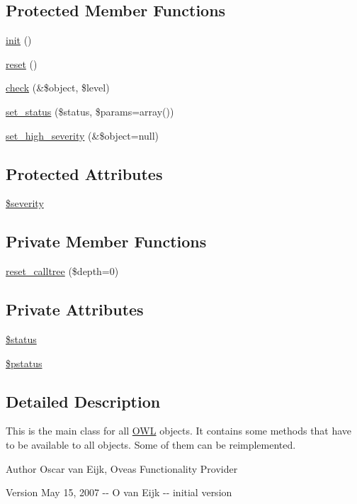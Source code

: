 \subsection*{Protected Member Functions}
\begin{DoxyCompactItemize}
\item 
\hyperlink{class__OWL_ae0ef3ded56e8a6b34b6461e5a721cd3e}{init} ()
\item 
\hyperlink{class__OWL_a2f2a042bcf31965194c03033df0edc9b}{reset} ()
\item 
\hyperlink{class__OWL_ad6f4f6946f40199dd0333cf219fa500e}{check} (\&\$object, \$level)
\item 
\hyperlink{class__OWL_aea912d0ede9b3c2a69b79072d94d4787}{set\_\-status} (\$status, \$params=array())
\item 
\hyperlink{class__OWL_a576829692a3b66e3d518853bf43abae3}{set\_\-high\_\-severity} (\&\$object=null)
\end{DoxyCompactItemize}
\subsection*{Protected Attributes}
\begin{DoxyCompactItemize}
\item 
\hyperlink{class__OWL_ad26b40a9dbbacb33e299b17826f8327c}{\$severity}
\end{DoxyCompactItemize}
\subsection*{Private Member Functions}
\begin{DoxyCompactItemize}
\item 
\hyperlink{class__OWL_a91389e63fc76f6513147f302cbd92a2e}{reset\_\-calltree} (\$depth=0)
\end{DoxyCompactItemize}
\subsection*{Private Attributes}
\begin{DoxyCompactItemize}
\item 
\hyperlink{class__OWL_aaf448f6bc8a90e20c09e9e2b8fe46eb5}{\$status}
\item 
\hyperlink{class__OWL_af30c6ce2c59df6da2ef0f7059be9231e}{\$pstatus}
\end{DoxyCompactItemize}


\subsection{Detailed Description}
This is the main class for all \hyperlink{classOWL}{OWL} objects. It contains some methods that have to be available to all objects. Some of them can be reimplemented. \begin{DoxyAuthor}{Author}
Oscar van Eijk, Oveas Functionality Provider 
\end{DoxyAuthor}
\begin{DoxyVersion}{Version}
May 15, 2007 -\/-\/ O van Eijk -\/-\/ initial version 
\end{DoxyVersion}



